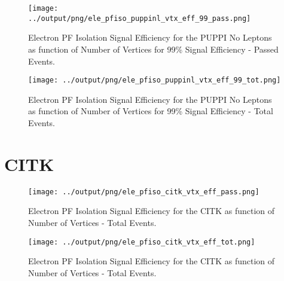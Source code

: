 \documentclass[11pt]{book}
\begin{document}
\begin{figure}[htb]
\centering
\texttt{[image: ../output/png/ele\_pfiso\_puppinl\_vtx\_eff\_99\_pass.png]}
\caption{Electron PF Isolation Signal Efficiency for the PUPPI No Leptons as function of Number of Vertices for 99\% Signal Efficiency - Passed Events.}
\label{fig:ele_pfiso_vtx_eff_puppinl_eff_99_pass}
\end{figure}

\begin{figure}[htb]
\centering
\texttt{[image: ../output/png/ele\_pfiso\_puppinl\_vtx\_eff\_99\_tot.png]}
\caption{Electron PF Isolation Signal Efficiency for the PUPPI No Leptons as function of Number of Vertices for 99\% Signal Efficiency - Total Events.}
\label{fig:ele_pfiso_vtx_eff_puppinl_eff_99_tot}
\end{figure}


\clearpage

\section{CITK}
\begin{figure}[htb]
\centering
\texttt{[image: ../output/png/ele\_pfiso\_citk\_vtx\_eff\_pass.png]}
\caption{Electron PF Isolation Signal Efficiency for the CITK as function of Number of Vertices - Total Events.}
\label{fig:ele_pfiso_vtx_eff_citk_pass}
\end{figure}

\begin{figure}[htb]
\centering
\texttt{[image: ../output/png/ele\_pfiso\_citk\_vtx\_eff\_tot.png]}
\caption{Electron PF Isolation Signal Efficiency for the CITK as function of Number of Vertices - Total Events.}
\label{fig:ele_pfiso_vtx_eff_citk_tot}
\end{figure}
\end{document}
